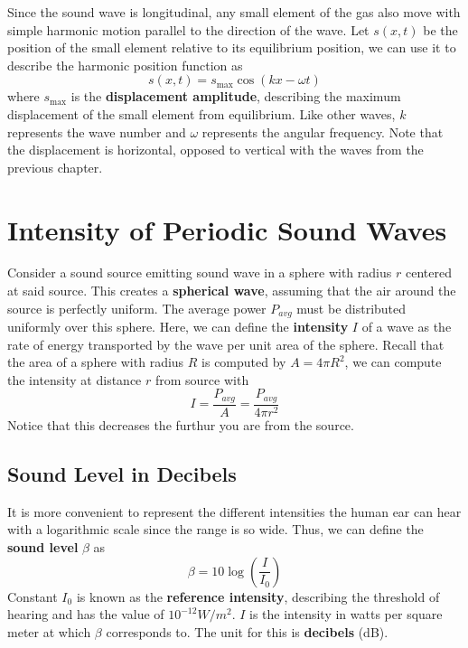 Since the sound wave is longitudinal, any small element of the gas also move with simple harmonic
motion parallel to the direction of the wave. Let $s(x, t)$ be the position of the small element 
relative to its equilibrium position, we can use it to describe the harmonic position function as 
\begin{equation}\label{17.1}
    s(x, t) = s_{\max}\cos(kx - \omega t)
\end{equation}
where $s_{\max}$ is the \textbf{displacement amplitude}, describing the maximum displacement of the
small element from equilibrium. Like other waves, $k$ represents the wave number and $\omega$
represents the angular frequency. Note that the displacement is horizontal, opposed to vertical 
with the waves from the previous chapter.

\section{Intensity of Periodic Sound Waves}

Consider a sound source emitting sound wave in a sphere with radius $r$ centered at said source.
This creates a \textbf{spherical wave}, assuming that the air around the source is perfectly uniform.
The average power $P_{avg}$ must be distributed uniformly over this sphere. Here, we can define 
the \textbf{intensity} $I$ of a wave as the rate of energy transported by the wave per unit area of
the sphere. Recall that the area of a sphere with radius $R$ is computed by $A = 4\pi R^2$,
we can compute the intensity at distance $r$ from source with 
\begin{equation}\label{17.13}
    I = \frac{P_{avg}}{A} = \frac{P_{avg}}{4\pi r^2}
\end{equation}
Notice that this decreases the furthur you are from the source.

\subsection{Sound Level in Decibels}

It is more convenient to represent the different intensities the human ear can hear with a
logarithmic scale since the range is so wide. Thus, we can define the \textbf{sound level} $\beta$
as \begin{equation}\label{17.14}
    \beta = 10\log\left(\frac{I}{I_0}\right)
\end{equation}
Constant $I_0$ is known as the \textbf{reference intensity}, describing the threshold of hearing and
has the value of $10^{-12} W/m^2$. $I$ is the intensity in watts per square meter at which $\beta$
corresponds to. The unit for this is \textbf{decibels} (dB).

